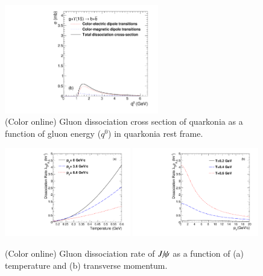 \documentclass[review]{elsarticle}
\newcommand{\Jpsi}{\ensuremath{J\hspace{-.08em}/\hspace{-.14em}\psi}\xspace} %
\begin{document}
{  
  \begin{figure}
    \includegraphics[width=0.60\textwidth]{Figures/Quarkonia_502TeV/Fig1b_Y1S_SigmaDq0.pdf}
    \caption{(Color online) Gluon dissociation cross section of quarkonia as a function of gluon energy ($q^{0}$) in
      quarkonia rest frame.}
    \label{fig:SigmaDQ0}
  \end{figure}
  


  \begin{figure}
    \includegraphics[width=0.49\textwidth]{Figures/Quarkonia_276TeV/Fig3a_DRateVsT.pdf}
    \includegraphics[width=0.49\textwidth]{Figures/Quarkonia_276TeV/Fig3b_DRateVsPt.pdf}
    \caption{(Color online) Gluon dissociation rate of $\Jpsi$ as a function of (a) temperature and  
      (b) transverse momentum.}
    \label{fig:DRateVsTempAndPt}
  \end{figure}
}
\end{document}
